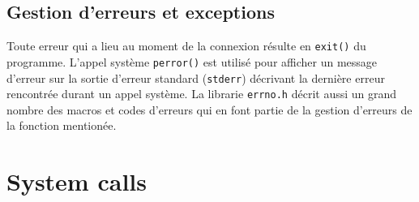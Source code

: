 \documentclass[11pt,a4paper]{article}
\begin{document}
\subsection{Gestion d'erreurs et exceptions}
\label{sec:err}

Toute erreur qui a lieu au moment de la connexion résulte en
\texttt{exit()} du programme. L'appel système \texttt{perror()} est
utilisé pour afficher un message d'erreur sur la sortie d'erreur
standard (\texttt{stderr}) décrivant la dernière erreur rencontrée
durant un appel système. La librarie \texttt{errno.h} décrit aussi un
grand nombre des macros et codes d'erreurs qui en font partie de la
gestion d'erreurs de la fonction mentionée.

\section{System calls}
\label{sec:calls}
\end{document}
